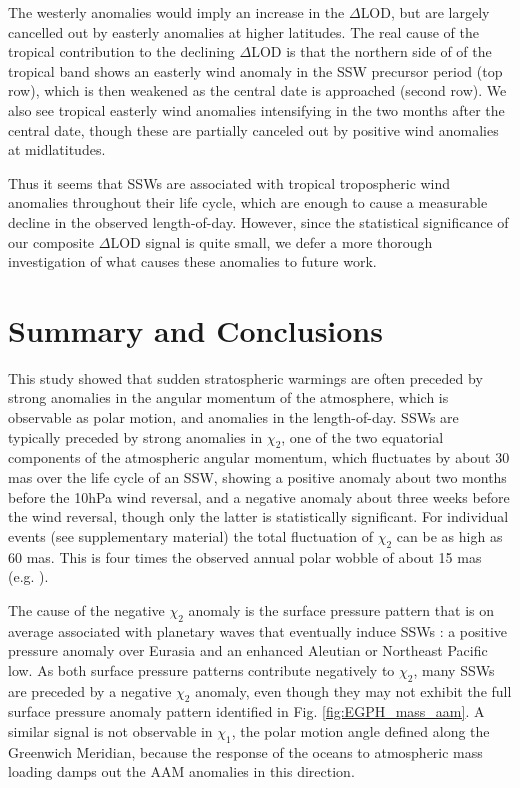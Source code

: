 \documentclass[draft,jgrga]{agutex}
\begin{document}
\begin{article}
 {The westerly anomalies would imply an increase in the $\Delta$LOD, but are largely cancelled out by easterly anomalies at higher latitudes.  
The real cause of the tropical contribution to the declining $\Delta$LOD is that the northern side of of the tropical band shows an easterly wind anomaly in the SSW precursor period (top row), which is then weakened as the central date is approached (second row).
We also see  tropical easterly wind anomalies intensifying in the two months after the central date, though these are partially canceled out by positive wind anomalies at midlatitudes.}

Thus it seems that SSWs are associated with tropical tropospheric wind anomalies throughout their life cycle, which are enough to cause a measurable decline in the observed length-of-day.
However, since the statistical significance of our composite $\Delta$LOD signal is quite small, we defer a more thorough investigation of what causes these anomalies to future work.


\section{Summary and Conclusions}
\label{sec:conclusions}

This study showed that sudden stratospheric warmings  {are often preceded by strong anomalies in the angular momentum of the atmosphere, which is observable as polar motion, and anomalies in the length-of-day.}
SSWs are typically preceded by  strong anomalies in  {$\chi_2$, one of the two equatorial components of the atmospheric angular momentum, which} fluctuates by about 30 mas over the life cycle of an SSW, showing a positive anomaly about two months before the 10hPa wind reversal, and a negative anomaly about three weeks before the wind reversal, though only the latter is statistically significant.  
 {For individual events (see supplementary material)} the total fluctuation of $\chi_2$ can be as high as  60 mas.
This is four times the observed annual polar wobble of about 15 mas (e.g. \cite{dobslawetal2010}).

The cause of the negative $\chi_2$ anomaly  is the  {surface} pressure pattern that is  {on average associated with} planetary waves that eventually induce SSWs \citep{Garfinkel2010, Kodera2013}: a positive pressure anomaly over Eurasia and an enhanced Aleutian  {or Northeast Pacific} low.
 As  {both surface pressure patterns} contribute negatively to $\chi_2$, many SSWs are preceded by a negative $\chi_2$ anomaly, even though they may not exhibit the full surface pressure anomaly pattern identified in Fig. \ref{fig:EGPH_mass_aam}.
A similar signal is not observable in $\chi_1$, the polar motion angle defined along the Greenwich Meridian, because the response of the oceans to atmospheric mass loading damps out the AAM anomalies in this direction.


\end{article}
\end{document}

